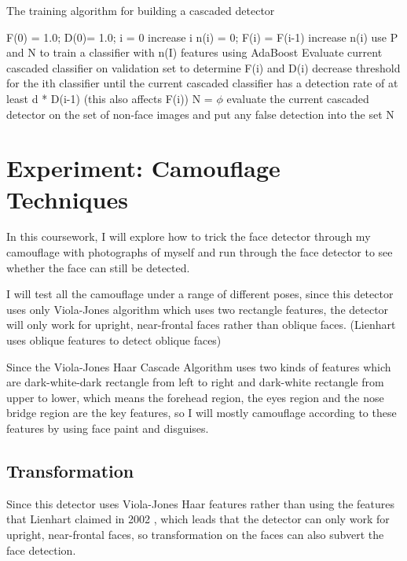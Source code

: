\documentclass[conference]{IEEEtran}
\begin{document}
\begin{algorithm}
  \caption{The training algorithm for building a cascaded detector}
  \begin{algorithmic}[2]
    \STATE F(0) = 1.0; D(0)= 1.0; i = 0
      \STATE increase i
      \STATW n(i) = 0; F(i) = F(i-1)
        \STATE increase n(i)
        \STATE use P and N to train a classifier with n(I) features using AdaBoost
        \STATE Evaluate current cascaded classifier on validation set to determine F(i) and D(i)
        \STATE decrease threshold for the ith classifier
        \STATE until the current cascaded classifier has a detection rate of at least d * D(i-1) (this also affects F(i))
        \STATE N = $\phi$
          \STATE evaluate the current cascaded detector on the set of non-face images
          \STATE and put any false detection into the set N
        \ENDIF
      \ENDWHILE
    \ENDWHILE
  \end{algorithmic}
\end{algorithm}

\section{Experiment: Camouflage Techniques}
In this coursework, I will explore how to trick the face detector through my camouflage with photographs of myself and run through the face detector to see whether the face can still be detected.

I will test all the camouflage under a range of different poses, since this detector uses only Viola-Jones algorithm which uses two rectangle features, the detector will only work for upright, near-frontal faces rather than oblique faces. (Lienhart uses oblique features to detect oblique faces)

Since the Viola-Jones Haar Cascade Algorithm uses two kinds of features which are dark-white-dark rectangle from left to right and dark-white rectangle from upper to lower, which means the forehead region, the eyes region and the nose bridge region are the key features, so I will mostly camouflage according to these features by using face paint and disguises.

\subsection{Transformation}
Since this detector uses Viola-Jones Haar features rather than using the features that Lienhart claimed in 2002 \cite{b5}, which leads that the detector can only work for upright, near-frontal faces, so transformation on the faces can also subvert the face detection.
\end{document}
